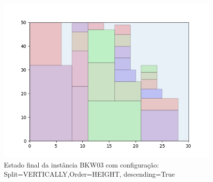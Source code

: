 \begin{figure}[H]
    \centering
    \caption[]{Estado final da instância BKW03 com configuração: Split=VERTICALLY,Order=HEIGHT, descending=True}
    \label{fig:bkw03-vertically-height-true}
    \includegraphics[scale=0.5]{output/figures/bkw/bkw03/vertically/height/true/00}
\end{figure}